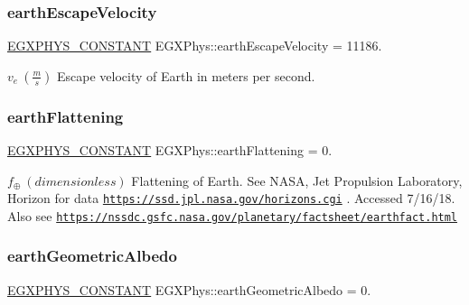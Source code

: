 \subsubsection{\texorpdfstring{earth\+Escape\+Velocity}{earthEscapeVelocity}}
{\footnotesize\ttfamily \mbox{\hyperlink{group___e_g_x_phys-_constants-_macros_ga76980d288494ce1714c9ac68a95ba702}{E\+G\+X\+P\+H\+Y\+S\+\_\+\+C\+O\+N\+S\+T\+A\+NT}} E\+G\+X\+Phys\+::earth\+Escape\+Velocity = 11186.}

$v_e\ (\frac{m}{s})$ Escape velocity of Earth in meters per second. \mbox{\label{group___e_g_x_phys-_constants-_astrophysics-_solar_system-_earth-_bulk_gaabbf1158b0f8e2f9545c8e4dc9b2e2bd}} 
\subsubsection{\texorpdfstring{earth\+Flattening}{earthFlattening}}
{\footnotesize\ttfamily \mbox{\hyperlink{group___e_g_x_phys-_constants-_macros_ga76980d288494ce1714c9ac68a95ba702}{E\+G\+X\+P\+H\+Y\+S\+\_\+\+C\+O\+N\+S\+T\+A\+NT}} E\+G\+X\+Phys\+::earth\+Flattening = 0.}

$f_{\oplus} \ (dimensionless)$ Flattening of Earth. See N\+A\+SA, Jet Propulsion Laboratory, Horizon for data \href{https://ssd.jpl.nasa.gov/horizons.cgi}{\tt https\+://ssd.\+jpl.\+nasa.\+gov/horizons.\+cgi} . Accessed 7/16/18. Also see \href{https://nssdc.gsfc.nasa.gov/planetary/factsheet/earthfact.html}{\tt https\+://nssdc.\+gsfc.\+nasa.\+gov/planetary/factsheet/earthfact.\+html} \mbox{\label{group___e_g_x_phys-_constants-_astrophysics-_solar_system-_earth-_bulk_ga4838765a5ca40d2cdde9691edd4ea45b}} 
\subsubsection{\texorpdfstring{earth\+Geometric\+Albedo}{earthGeometricAlbedo}}
{\footnotesize\ttfamily \mbox{\hyperlink{group___e_g_x_phys-_constants-_macros_ga76980d288494ce1714c9ac68a95ba702}{E\+G\+X\+P\+H\+Y\+S\+\_\+\+C\+O\+N\+S\+T\+A\+NT}} E\+G\+X\+Phys\+::earth\+Geometric\+Albedo = 0.}

